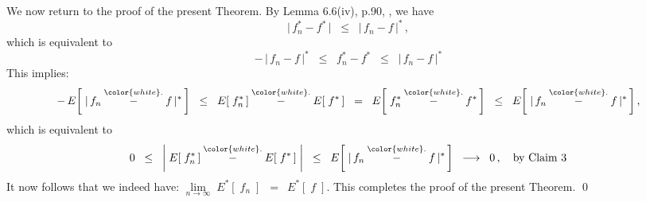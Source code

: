 \vskip 0.8cm
\noindent
We now return to the proof of the present Theorem.
By Lemma 6.6(iv), p.90, \cite{Kosorok2008}, we have
\begin{equation*}
\vert\,f_{n}^{*} - f^{*}\,\vert
\;\; \leq \;\;
	\vert\,f_{n} - f\,\vert^{*}\,,
\end{equation*}
which is equivalent to
\begin{equation*}
-\,\vert\,f_{n} - f\,\vert^{*}
\;\; \leq \;\;
	f_{n}^{*} - f^{*}
\;\; \leq \;\;
	\vert\,f_{n} - f\,\vert^{*}
\end{equation*}
This implies:
\begin{equation*}
-\,E\!\left[\;\vert\,f_{n} \overset{{\color{white}.}}{-} f\,\vert^{*}\,\right]
\;\; \leq \;\;
	E\!\left[\;f_{n}^{*}\,\right] \overset{{\color{white}.}}{-} E\!\left[\;f^{*}\,\right]
\;\; = \;\;
	E\!\left[\;f_{n}^{*} \overset{{\color{white}.}}{-} f^{*}\,\right]
\;\; \leq \;\;
	E\!\left[\;\vert\,f_{n} \overset{{\color{white}.}}{-} f\,\vert^{*}\,\right],
\end{equation*}
which is equivalent to
\begin{equation*}
0
\;\; \leq \;\;
	\left\vert\;
		E\!\left[\;f_{n}^{*}\,\right] \overset{{\color{white}.}}{-} E\!\left[\;f^{*}\,\right]
	\;\right\vert
\;\; \leq \;\;
	E\!\left[\;\vert\,f_{n} \overset{{\color{white}.}}{-} f\,\vert^{*}\,\right]
\;\; \longrightarrow \;\;
	0\,,
	\quad
	\textnormal{by Claim 3}
\end{equation*}
It now follows that we indeed have:
\;$\underset{n\rightarrow\infty}{\lim}\;E^{*}\!\left[\;f_{n}\;\right]$ \,$=$\, $E^{*}\!\left[\;f\;\right]$.\;
This completes the proof of the present Theorem.
\qed


\renewcommand{\theenumi}{\roman{enumi}}
\renewcommand{\labelenumi}{\textnormal{(\theenumi)}$\;\;$}

